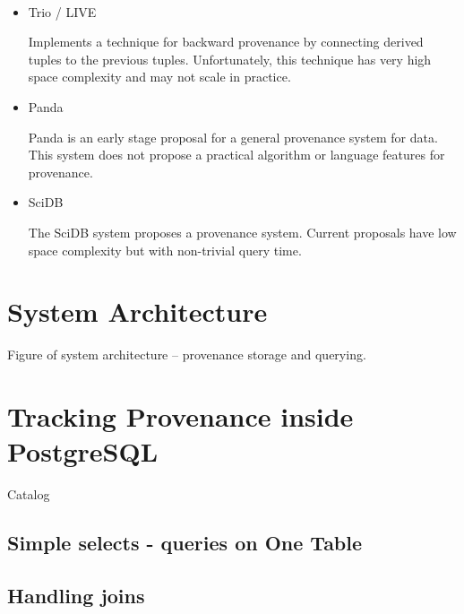 \documentclass[11pt]{article}
\begin{document}

~\cite{buneman00}

\cite{simmhan05asurvey} 

\cite{simmhan_survey} 

\cite{glavic_dataprovenance}

\cite{queryprov_sig2010}

\cite{chapman_provstorage}

\cite{plt_stanford}

\begin{itemize}
\item Trio / LIVE \cite{widom2005trio, sarma2010live} 
  
Implements a technique for backward provenance by connecting derived tuples to the previous tuples. Unfortunately, this technique has very high space complexity and may not scale in practice. 

\item Panda \cite{ikeda2010panda} 

Panda is an early stage proposal for a general provenance system for data. This system does not propose a practical algorithm or language features for provenance. 

\item SciDB \cite{cudré2009demonstration}

The SciDB system proposes a provenance system. Current proposals have low space complexity but with non-trivial query time. 

\end{itemize}

\section{System Architecture}

Figure of system architecture -- provenance storage and querying.

\section{Tracking Provenance inside PostgreSQL}

Catalog

\subsection{Simple selects - queries on One Table}

\subsection{Handling joins}
\end{document}
